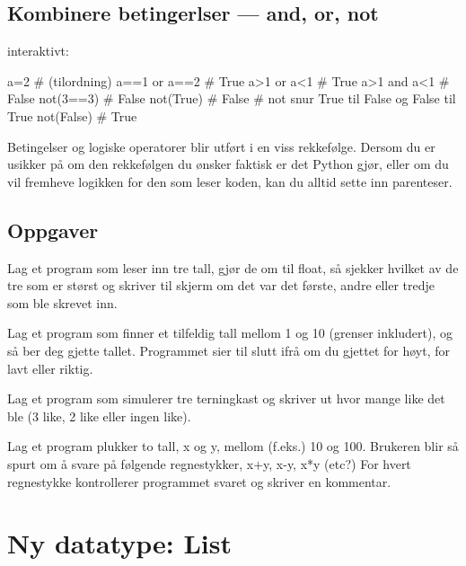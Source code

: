 {\subsection{Kombinere betingerlser --- and, or, not}

interaktivt:
\begin{usncodebox}
a=2             # (tilordning)
a==1 or a==2    # True 
a>1  or  a<1    # True 
a>1  and a<1    # False
not(3==3)       # False
not(True)       # False  # not snur True til False og False til True
not(False)      # True 
\end{usncodebox}

Betingelser og logiske operatorer blir utført i en viss rekkefølge. Dersom du er usikker på om den rekkefølgen du ønsker faktisk er det Python gjør, eller om du vil fremheve logikken for den som leser koden, kan du alltid sette inn parenteser.

\subsection{Oppgaver}

\begin{question}
Lag et program som leser inn tre tall, gjør de om til float, så sjekker hvilket av de tre som er størst og skriver til skjerm om det var det første, andre eller tredje som ble skrevet inn.
\end{question}

\begin{question}
Lag et program som finner et tilfeldig tall mellom 1 og 10 (grenser inkludert), og så ber deg gjette tallet. Programmet sier til slutt ifrå om du gjettet for høyt, for lavt eller riktig.
\end{question}

\begin{question}
Lag et program som simulerer tre terningkast og skriver ut hvor mange like det ble (3 like, 2 like eller ingen like).
\end{question}

\begin{question}
Lag et program plukker to tall, x og y, mellom (f.eks.) 10 og 100. Brukeren blir så spurt om å svare på følgende regnestykker, x+y, x-y, x*y (etc?) For hvert regnestykke kontrollerer programmet svaret og skriver en kommentar. 
\end{question}

\section{Ny datatype: List}

}
